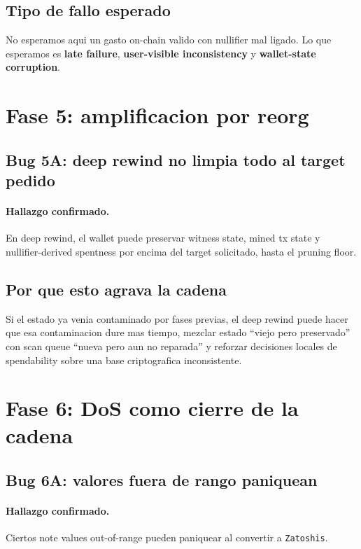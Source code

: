 \documentclass[11pt,a4paper]{article}
\begin{document}
\subsection{Tipo de fallo esperado}

No esperamos aqui un gasto on-chain valido con nullifier mal ligado. Lo que
esperamos es \textbf{late failure}, \textbf{user-visible inconsistency} y
\textbf{wallet-state corruption}.

\section{Fase 5: amplificacion por reorg}

\subsection{Bug 5A: deep rewind no limpia todo al target pedido}

\paragraph{Hallazgo confirmado.}
En deep rewind, el wallet puede preservar witness state, mined tx state y
nullifier-derived spentness por encima del target solicitado, hasta el pruning
floor.

\subsection{Por que esto agrava la cadena}

Si el estado ya venia contaminado por fases previas, el deep rewind puede
hacer que esa contaminacion dure mas tiempo, mezclar estado ``viejo pero
preservado'' con scan queue ``nueva pero aun no reparada'' y reforzar
decisiones locales de spendability sobre una base criptografica inconsistente.

\section{Fase 6: DoS como cierre de la cadena}

\subsection{Bug 6A: valores fuera de rango paniquean}

\paragraph{Hallazgo confirmado.}
Ciertos note values out-of-range pueden paniquear al convertir a
\texttt{Zatoshis}.
\end{document}
